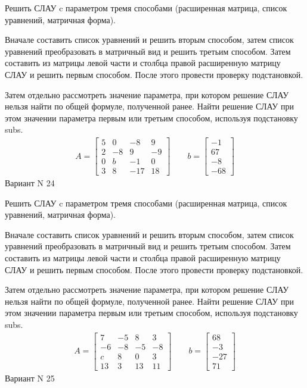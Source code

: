 \documentclass[11pt]{report}
\begin{document}
Решить СЛАУ c параметром тремя способами (расширенная матрица, список уравнений, матричная форма).

Вначале составить список уравнений и решить вторым способом,
затем список уравнений преобразовать в матричный вид и решить третьим способом.
Затем составить из матрицы левой части и столбца правой расширенную матрицу СЛАУ и решить первым способом.
После этого провести проверку подстановкой.

Затем отдельно рассмотреть значение параметра, при котором решение СЛАУ нельзя найти по общей формуле,
полученной ранее.
Найти решение СЛАУ при этом значении параметра первым или третьим способом, используя подстановку subs.
\begin{align*}
    A = \left[\begin{matrix}5 & 0 & -8 & 9\\2 & -8 & 9 & -9\\0 & b & -1 & 0\\3 & 8 & -17 & 18\end{matrix}\right]
\qquad b = \left[\begin{matrix}-1\\67\\-8\\-68\end{matrix}\right]
\end{align*}
\newpage
Вариант N 24


Решить СЛАУ c параметром тремя способами (расширенная матрица, список уравнений, матричная форма).

Вначале составить список уравнений и решить вторым способом,
затем список уравнений преобразовать в матричный вид и решить третьим способом.
Затем составить из матрицы левой части и столбца правой расширенную матрицу СЛАУ и решить первым способом.
После этого провести проверку подстановкой.

Затем отдельно рассмотреть значение параметра, при котором решение СЛАУ нельзя найти по общей формуле,
полученной ранее.
Найти решение СЛАУ при этом значении параметра первым или третьим способом, используя подстановку subs.
\begin{align*}
    A = \left[\begin{matrix}7 & -5 & 8 & 3\\-6 & -8 & -5 & -8\\c & 8 & 0 & 3\\13 & 3 & 13 & 11\end{matrix}\right]
\qquad b = \left[\begin{matrix}68\\-3\\-27\\71\end{matrix}\right]
\end{align*}
\newpage
Вариант N 25
\end{document}
